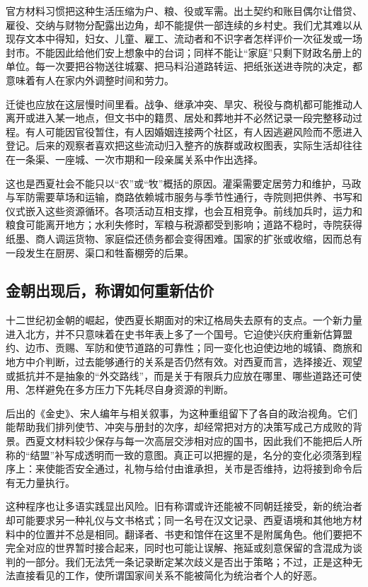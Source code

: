官方材料习惯把这种生活压缩为户、粮、役或军需。出土契约和账目偶尔让借贷、雇役、交纳与财物分配露出边角，却不能提供一部连续的乡村史。我们尤其难以从现存文本中得知，妇女、儿童、雇工、流动者和不识字者怎样评价一次征发或一场封市。不能因此给他们安上想象中的台词；同样不能让“家庭”只剩下财政名册上的单位。每一次要把谷物送往城寨、把马料沿道路转运、把纸张送进寺院的决定，都意味着有人在家内外调整时间和劳力。

迁徙也应放在这层慢时间里看。战争、继承冲突、旱灾、税役与商机都可能推动人离开或进入某一地点，但文书中的籍贯、居处和葬地并不必然记录一段完整移动过程。有人可能因官役暂住，有人因婚姻连接两个社区，有人因逃避风险而不愿进入登记。后来的观察者喜欢把这些流动归入整齐的族群或政权图表，实际生活却往往在一条渠、一座城、一次市期和一段亲属关系中作出选择。

这也是西夏社会不能只以“农”或“牧”概括的原因。灌渠需要定居劳力和维护，马政与军防需要草场和运输，商路依赖城市服务与季节性通行，寺院则把供养、书写和仪式嵌入这些资源循环。各项活动互相支撑，也会互相竞争。前线加兵时，运力和粮食可能离开地方；水利失修时，军粮与税源都受到影响；道路不稳时，寺院获得纸墨、商人调运货物、家庭偿还债务都会变得困难。国家的扩张或收缩，因而总有一段发生在厨房、渠口和牲畜棚旁的后果。

\subsection{金朝出现后，称谓如何重新估价}

十二世纪初金朝的崛起，使西夏长期面对的宋辽格局失去原有的支点。一个新力量进入北方，并不只意味着在史书年表上多了一个国号。它迫使兴庆府重新估算盟约、边市、贡赐、军防和使节道路的可靠性；同一变化也迫使边地的城镇、商旅和地方中介判断，过去能够通行的关系是否仍然有效。对西夏而言，选择接近、观望或抵抗并不是抽象的“外交路线”，而是关于有限兵力应放在哪里、哪些道路还可使用、怎样避免在多方压力下先耗尽自身资源的判断。

后出的《金史》、宋人编年与相关叙事，为这种重组留下了各自的政治视角。它们能帮助我们排列使节、冲突与册封的次序，却经常把对方的决策写成己方成败的背景。西夏文材料较少保存与每一次高层交涉相对应的国书，因此我们不能把后人所称的“结盟”补写成透明而一致的意图。真正可以把握的是，名分的变化必须落到程序上：来使能否安全通过，礼物与给付由谁承担，关市是否维持，边将接到命令后有无力量执行。

这种程序也让多语实践显出风险。旧有称谓或许还能被不同朝廷接受，新的统治者却可能要求另一种礼仪与文书格式；同一名号在汉文记录、西夏语境和其他地方材料中的位置并不总是相同。翻译者、书吏和馆伴在这里不是附属角色。他们要把不完全对应的世界暂时接合起来，同时也可能让误解、拖延或刻意保留的含混成为谈判的一部分。我们无法凭一条记录断定某次歧义是否出于策略；不过，正是这种无法直接看见的工作，使所谓国家间关系不能被简化为统治者个人的好恶。

